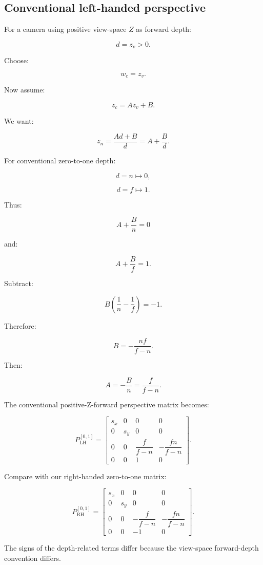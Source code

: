 \subsection{Conventional left-handed perspective}\label{02-foundations-ii-ch033-conventional-left-handed-perspective}

For a camera using positive view-space \(Z\) as forward depth:

\[
 d=z_v>0.
\]

Choose:

\[
 \boxed{w_c=z_v}.
\]

Now assume:

\[
 z_c=Az_v+B.
\]

We want:

\[
 z_n=\frac{Ad+B}{d} =A+\frac Bd.
\]

For conventional zero-to-one depth:

\[
 d=n\mapsto0,
\]

\[
 d=f\mapsto1.
\]

Thus:

\[
 A+\frac Bn=0
\]

and:

\[
 A+\frac Bf=1.
\]

Subtract:

\[
 B\left(\frac1n-\frac1f\right)=-1.
\]

Therefore:

\[
 \boxed{ B=-\frac{nf}{f-n} }.
\]

Then:

\[
 A=-\frac Bn=\frac f{f-n}.
\]

The conventional positive-Z-forward perspective matrix becomes:

\[
 \boxed{ P_{\mathrm{LH}}^{[0,1]}= \begin{bmatrix} s_x&0&0&0\\ 0&s_y&0&0\\ 0&0&\dfrac f{f-n}&-\dfrac{fn}{f-n}\\ 0&0&1&0 \end{bmatrix} }.
\]

Compare with our right-handed zero-to-one matrix:

\[
 P_{\mathrm{RH}}^{[0,1]}= \begin{bmatrix} s_x&0&0&0\\ 0&s_y&0&0\\ 0&0&-\dfrac f{f-n}&-\dfrac{fn}{f-n}\\ 0&0&-1&0 \end{bmatrix}.
\]

The signs of the depth-related terms differ because the view-space forward-depth convention differs.

